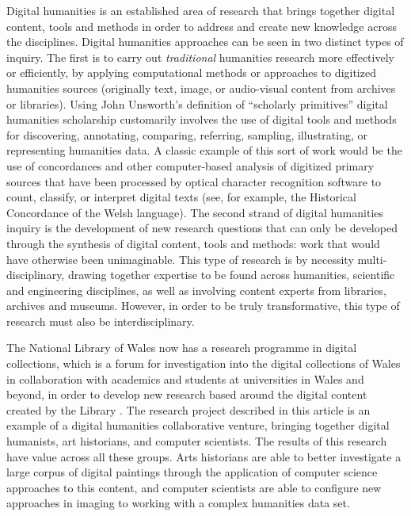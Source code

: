 Digital humanities is an established area of research that brings together
digital content, tools and methods in order to address and create new knowledge
across the disciplines. Digital humanities approaches can be seen in two
distinct types of inquiry. The first is to carry out \emph{traditional}
humanities research more effectively or efficiently, by applying computational
methods or approaches to digitized humanities sources (originally text, image,
or audio-visual content from archives or libraries). Using John Unsworth’s
definition of ``scholarly primitives''\cite{Unsworth2000Scholarly} digital humanities
scholarship customarily involves the use of digital tools and methods for
discovering, annotating, comparing, referring, sampling, illustrating, or
representing humanities data. A classic example of this sort of work would be
the use of concordances and other computer-based analysis of digitized primary
sources that have been processed by optical character recognition software to
count, classify, or interpret digital texts (see, for example, the Historical
Concordance of the Welsh language\cite{2004Corpws}).  The second strand
of digital humanities inquiry is the development of new research questions that
can only be developed through the synthesis of digital content, tools and
methods: work that would have otherwise been unimaginable\cite{Hughes2011Evaluating}. This
type of research is by necessity multi-disciplinary, drawing together expertise
to be found across humanities, scientific and engineering disciplines, as well
as involving content experts from libraries, archives and museums. However, in
order to be truly transformative, this type of research must also be
interdisciplinary. 

The National Library of Wales now has a research programme in digital
collections, which is a forum for investigation into the digital collections of
Wales in collaboration with academics and students at universities in Wales and
beyond, in order to develop new research based around the digital content
created by the Library \cite{2012Research}. The research project described in this
article is an example of a digital humanities collaborative venture, bringing
together digital humanists, art historians, and computer scientists.  The
results of this research have value across all these groups. Arts historians
are able to better investigate a large corpus of digital paintings through the
application of computer science approaches to this content, and computer
scientists are able to configure new approaches in imaging to working with a
complex humanities data set.

